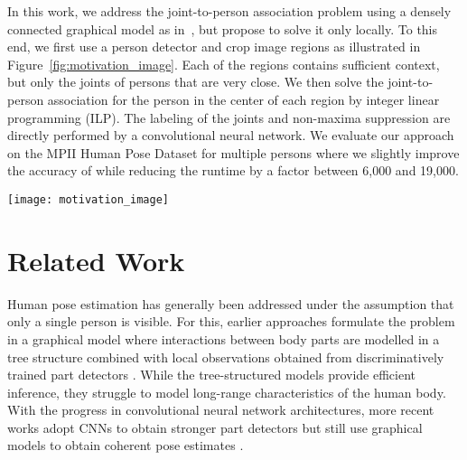 \documentclass[runningheads]{llncs}
\begin{document}
In this work, we address the joint-to-person association problem using a densely connected graphical model as in~\cite{pishchulin2015deepcut}, but propose to solve it only locally. To this end, we first use a person detector and crop image regions as illustrated in  Figure~\ref{fig:motivation_image}. Each of the regions contains sufficient context, but only the joints of persons that are very close. We then solve the joint-to-person association for the person in the center of each region by integer linear programming (ILP). The labeling of the joints and non-maxima suppression are directly performed by a convolutional neural network. We evaluate our approach on the MPII Human Pose Dataset for multiple persons where we slightly improve the accuracy of \cite{pishchulin2015deepcut} while reducing the runtime by a factor between 6,000 and 19,000.   


\begin{figure*}[t!]
\centering
\captionsetup[figure]{skip=0pt}
\texttt{[image: motivation\_image]}
\caption{Example image from the multi-person subset of the MPII Pose Dataset~\cite{andriluka_cvpr2014}.}
\label{fig:motivation_image}
\end{figure*}


\section{Related Work}
Human pose estimation has generally been addressed under the assumption that only a single person is visible. For this, earlier approaches formulate the problem in a graphical model where interactions between body parts are modelled in a tree structure combined with local observations obtained from discriminatively trained part detectors \cite{Felzenszwalb_ijcv2005, tran2010improved, andriluka_ijcv2012, pishchulin_cvpr2013, Wang_CVPR2013, yang_tpami2014, dantone_tpami2014}. While the tree-structured models provide efficient inference, they struggle to model long-range characteristics of the human body. With the progress in convolutional neural network architectures, more recent works adopt CNNs to obtain stronger part detectors but still use graphical models to obtain coherent pose estimates \cite{chen_nips2014, tompson2014joint, tompson_cvpr2015}. 
\end{document}
